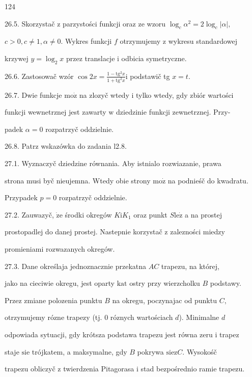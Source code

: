 \documentclass[a4paper,12pt]{article}
\begin{document}
124

26.5. Skorzystač $\mathrm{z}$ parzystości funkcji oraz ze wzoru $\log_{c}\alpha^{2}=2\log_{c}|\alpha|,$

$c>0, c\neq 1, \alpha\neq 0$. Wykres funkcji $f$ otrzymujemy $\mathrm{z}$ wykresu standardowej

krzywej $y=\log_{2}x$ przez translacje $\mathrm{i}$ odbicia symetryczne.

26.6. Zastosowač wzór $\displaystyle \cos 2x=\frac{1-\mathrm{t}\mathrm{g}^{2}x}{1+\mathrm{t}\mathrm{g}^{2}x}\mathrm{i}$ podstawič tg $x=t.$

26.7. Dwie funkcje $\mathrm{m}\mathrm{o}\dot{\mathrm{z}}$ na zlozyč wtedy $\mathrm{i}$ tylko wtedy, gdy zbiór wartości

funkcji wewnetrznej jest zawarty $\mathrm{w}$ dziedzinie funkcji zewnetrznej. Przy-

padek $\alpha=0$ rozpatrzyč oddzielnie.

26.8. Patrz wskazówka do zadania l2.8.

27.1. Wyznaczyč dziedzine równania. Aby istnialo rozwiazanie, prawa

strona musi byč nieujemna. Wtedy obie strony $\mathrm{m}\mathrm{o}\dot{\mathrm{z}}$ na podnieśč do kwadratu.

Przypadek $p=0$ rozpatrzyč oddzielnie.

27.2. Zauwazyč, $\dot{\mathrm{z}}\mathrm{e}$ środki okregów $K\mathrm{i}K_{1}$ oraz punkt $S\mathrm{l}\mathrm{e}\dot{\mathrm{z}}$ a na prostej

prostopadlej do danej prostej. Nastepnie korzystač $\mathrm{z}$ zalezności miedzy

promieniami rozwazanych okregów.

27.3. Dane określaja jednoznacznie przekatna $AC$ trapezu, na której,

jako na cieciwie okregu, jest oparty $\mathrm{k}\mathrm{a}\mathrm{t}$ ostry przy wierzcholku $B$ podstawy.

Przez zmiane polozenia punktu $B$ na okregu, poczynajac od punktu $C,$

otrzymujemy rózne trapezy (tj. $0$ róznych wartościach $d$). Minimalne $d$

odpowiada sytuacji, gdy krótsza podstawa trapezu jest równa zeru $\mathrm{i}$ trapez

staje $\mathrm{s}\mathrm{i}\mathrm{e}$ trójkatem, a maksymalne, gdy $B$ pokrywa $\mathrm{s}\mathrm{i}\mathrm{e} \mathrm{z} C$. Wysokośč

trapezu obliczyč $\mathrm{z}$ twierdzenia Pitagorasa $\mathrm{i}$ stad bezpośrednio ramie trapezu.
\end{document}
